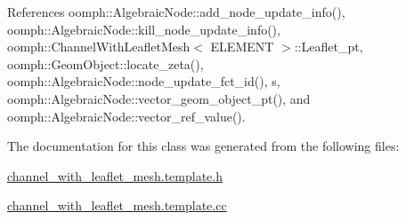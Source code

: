 References oomph\+::\+Algebraic\+Node\+::add\+\_\+node\+\_\+update\+\_\+info(), oomph\+::\+Algebraic\+Node\+::kill\+\_\+node\+\_\+update\+\_\+info(), oomph\+::\+Channel\+With\+Leaflet\+Mesh$<$ E\+L\+E\+M\+E\+N\+T $>$\+::\+Leaflet\+\_\+pt, oomph\+::\+Geom\+Object\+::locate\+\_\+zeta(), oomph\+::\+Algebraic\+Node\+::node\+\_\+update\+\_\+fct\+\_\+id(), s, oomph\+::\+Algebraic\+Node\+::vector\+\_\+geom\+\_\+object\+\_\+pt(), and oomph\+::\+Algebraic\+Node\+::vector\+\_\+ref\+\_\+value().



The documentation for this class was generated from the following files\+:\begin{DoxyCompactItemize}
\item 
\hyperlink{channel__with__leaflet__mesh_8template_8h}{channel\+\_\+with\+\_\+leaflet\+\_\+mesh.\+template.\+h}\item 
\hyperlink{channel__with__leaflet__mesh_8template_8cc}{channel\+\_\+with\+\_\+leaflet\+\_\+mesh.\+template.\+cc}\end{DoxyCompactItemize}

